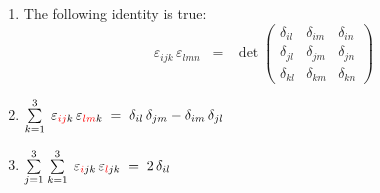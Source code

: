 \vskip 0.2cm
\begin{lemma}
\label{LeviCivitaSymbolProperties}
\mbox{}
\vskip -0.05cm
\noindent
\begin{enumerate}
\item
    The following identity is true:
    \begin{equation*}
    \varepsilon_{ijk}\,\varepsilon_{lmn}
    \;\; = \;\;
        \det\left(\begin{array}{ccc}
            \delta_{il} & \delta_{im} & \delta_{in}
            \\
            \delta_{jl} & \delta_{jm} & \delta_{jn}
            \\
            \delta_{kl} & \delta_{km} & \delta_{kn}
            \end{array}\right)
    \end{equation*}
\item
    $
    \overset{3}{\underset{k=1}{\sum}}\;\,
    \varepsilon_{{\color{red}ij}k}\,
    \varepsilon_{{\color{red}lm}k}
    \; = \;
        \delta_{il}\,\delta_{jm} - \delta_{im}\,\delta_{jl}
    $
\item
    $
    \overset{3}{\underset{j=1}{\sum}}\;
    \overset{3}{\underset{k=1}{\sum}}\;\,
    \varepsilon_{{\color{red}i}jk}\,
    \varepsilon_{{\color{red}l}jk}
    \; = \;
        2\,\delta_{{\color{black}il}}
    $
\end{enumerate}
\end{lemma}
\proof
